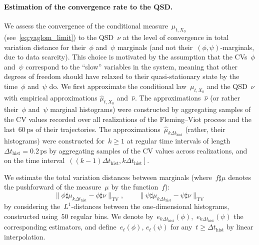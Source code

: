 \documentclass[a4]{article}
\newcommand{\1}{\mathbbm 1}
\begin{document}
\paragraph{Estimation of the convergence rate to the QSD.}
We assess the convergence of the conditional measure~$\mu_{t,X_0}$ (see~\eqref{eq:yaglom_limit}) to the QSD~$\nu$ at the level of convergence in total variation distance for their~$\phi$ and~$\psi$ marginals (and not their~$(\phi,\psi)$-marginals, due to data scarcity). This choice is motivated by the assumption that the CVs~$\phi$ and~$\psi$ correspond to the ``slow'' variables in the system, meaning that other degrees of freedom should have relaxed to their quasi-stationary state by the time~$\phi$ and~$\psi$ do. We first approximate the conditional law~$\mu_{t,X_0}$ and the QSD~$\nu$ with empirical approximations $\widehat{\mu}_{t,X_0}$ and~$\widehat{\nu}$.
The approximations~$\widehat{\nu}$ (or rather their~$\phi$ and~$\psi$ marginal histograms) were constructed by aggregating samples of the CV values recorded over all realizations of the Fleming--Viot process and the last~$60\,\mathrm{ps}$ of their trajectories.
The approximations~$\widehat{\mu}_{k\Delta t_{\mathrm{hist}}}$ (rather, their histograms) were constructed for~$k\geq 1$ at regular time intervals of length~$\Delta t_{\mathrm{hist}}=0.2\,\mathrm{ps}$ by aggregating samples of the CV values across realizations, and on the time interval~$\left((k-1)\Delta t_{\mathrm{hist}},k\Delta t_{\mathrm{hist}}\right]$.

We estimate the total variation distances between marginals (where~$f\sharp\mu$ denotes the pushforward of the measure~$\mu$ by the function~$f$):
$$\|\phi\sharp\mu_{k\Delta t_{\mathrm{hist}}}-\phi\sharp\nu\|_{\mathrm{TV}},\qquad\|\psi\sharp\mu_{k\Delta t_{\mathrm{hist}}}-\psi\sharp\nu\|_{\mathrm{TV}}$$
by considering the~$L^1$-distances between the one-dimensional histograms, constructed using~$50$ regular bins. We denote by~$e_{k\Delta t_{\mathrm{hist}}}(\phi)$,~$e_{k\Delta t_{\mathrm{hist}}}(\psi)$ the corresponding estimators, and define~$e_t(\phi),\,e_t(\psi)$ for any~$t\geq \Delta t_{\mathrm{hist}}$ by linear interpolation.
\end{document}
